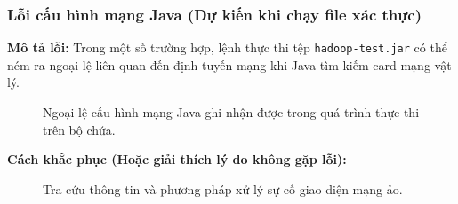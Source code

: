 \subsubsection{Lỗi cấu hình mạng Java (Dự kiến khi chạy file xác thực)}
\textbf{Mô tả lỗi:} Trong một số trường hợp, lệnh thực thi tệp \texttt{hadoop-test.jar} có thể ném ra ngoại lệ liên quan đến định tuyến mạng khi Java tìm kiếm card mạng vật lý.

\begin{figure}[H]
    \centering
    \caption{Ngoại lệ cấu hình mạng Java ghi nhận được trong quá trình thực thi trên bộ chứa.}
    \label{fig:network_error}
\end{figure}

\textbf{Cách khắc phục (Hoặc giải thích lý do không gặp lỗi):}
\begin{figure}[H]
    \centering
    \caption{Tra cứu thông tin và phương pháp xử lý sự cố giao diện mạng ảo.}
    \label{fig:network_error_fix}
\end{figure}
